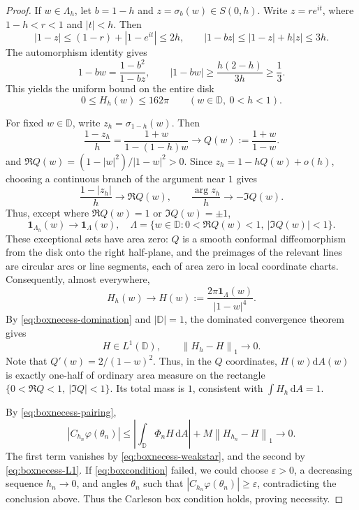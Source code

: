 \documentclass[12pt,a4paper]{article}
\theoremstyle{remark}
\newcommand{\D}{\mathbb D}
\newcommand{\dA}{\,\mathrm dA}
\newcommand{\norm}[1]{\left\lVert#1\right\rVert}
\newcommand{\abs}[1]{\left\lvert#1\right\rvert}
\begin{document}
\begin{proof}
If $w\in\Lambda_h$, let $b=1-h$ and $z=\sigma_b(w)\in S(0,h)$.
Write $z=re^{it}$, where $1-h<r<1$ and $|t|<h$. Then
\[
|1-z|\le(1-r)+|1-e^{it}|\le2h,
\qquad |1-bz|\le |1-z|+h|z|\le3h.
\]
The automorphism identity gives
\[
1-bw=\frac{1-b^2}{1-bz},
\qquad |1-bw|\ge\frac{h(2-h)}{3h}\ge\frac13.
\]
This yields the uniform bound on the entire disk
\begin{equation}\label{eq:boxnecess-domination}
0\le H_h(w)\le162\pi\qquad(w\in\D,\ 0<h<1).
\end{equation}

For fixed $w\in\D$, write $z_h=\sigma_{1-h}(w)$. Then
\begin{equation}\label{eq:boxnecess-cayley}
\frac{1-z_h}{h}=\frac{1+w}{1-(1-h)w}
\longrightarrow Q(w):=\frac{1+w}{1-w}.
\end{equation}
and $\Re Q(w)=(1-|w|^2)/|1-w|^2>0$.
Since $z_h=1-hQ(w)+o(h)$, choosing a continuous branch of the argument near $1$ gives
\[
\frac{1-|z_h|}{h}\longrightarrow\Re Q(w),
\qquad
\frac{\arg z_h}{h}\longrightarrow-\Im Q(w).
\]
Thus, except where $\Re Q(w)=1$ or $\Im Q(w)=\pm1$,
\[
\mathbf1_{\Lambda_h}(w)\longrightarrow\mathbf1_\Lambda(w),
\quad
\Lambda=\{w\in\D:0<\Re Q(w)<1,\ |\Im Q(w)|<1\}.
\]
These exceptional sets have area zero: $Q$ is a smooth conformal diffeomorphism from the disk onto the right half-plane,
and the preimages of the relevant lines are circular arcs or line segments, each of area zero in local coordinate charts.
Consequently, almost everywhere,
\[
H_h(w)\longrightarrow H(w):=
\frac{2\pi\mathbf1_\Lambda(w)}{|1-w|^4}.
\]
By \eqref{eq:boxnecess-domination} and $|\D|=1$, the dominated convergence theorem gives
\begin{equation}\label{eq:boxnecess-L1}
H\in L^1(\D),\qquad \norm{H_h-H}_1\longrightarrow0.
\end{equation}
Note that $Q'(w)=2/(1-w)^2$. Thus,
in the $Q$ coordinates, $H(w)\mathrm dA(w)$ is exactly one-half of ordinary area measure on the rectangle
$\{0<\Re Q<1,\ |\Im Q|<1\}$.
Its total mass is $1$, consistent with $\int H_h\dA=1$.

By \eqref{eq:boxnecess-pairing},
\[
|C_{h_n}\varphi(\theta_n)|
\le\abs{\int_\D\Phi_nH\dA}+M\norm{H_{h_n}-H}_1\longrightarrow0.
\]
The first term vanishes by \eqref{eq:boxnecess-weakstar}, and the second by \eqref{eq:boxnecess-L1}.
If \eqref{eq:boxcondition} failed, we could choose $\varepsilon>0$, a decreasing sequence $h_n\to0$,
and angles $\theta_n$ such that $|C_{h_n}\varphi(\theta_n)|\ge\varepsilon$,
contradicting the conclusion above. Thus the Carleson box condition holds, proving necessity.
\end{proof}
\end{document}

